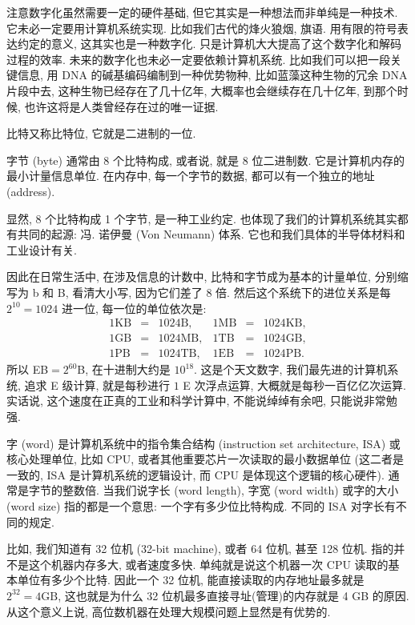 \documentclass[a4paper]{ctexart}
\begin{document}
注意数字化虽然需要一定的硬件基础, 但它其实是一种想法而非单纯是一种技术.
它未必一定要用计算机系统实现. 比如我们古代的烽火狼烟, 旗语. 用有限的符号表达约定的意义,
这其实也是一种数字化. 只是计算机大大提高了这个数字化和解码过程的效率.
未来的数字化也未必一定要依赖计算机系统. 比如我们可以把一段关键信息,
用 DNA 的碱基编码编制到一种优势物种, 比如蓝藻这种生物的冗余 DNA 片段中去,
这种生物已经存在了几十亿年, 大概率也会继续存在几十亿年, 到那个时候,
也许这将是人类曾经存在过的唯一证据.

比特又称比特位, 它就是二进制的一位.

 字节 (byte) 通常由 8 个比特构成, 或者说,
就是 8 位二进制数. 它是计算机内存的最小计量信息单位. 在内存中, 每一个字节的数据,
都可以有一个独立的地址 (address).

显然, 8 个比特构成 1 个字节, 是一种工业约定.
也体现了我们的计算机系统其实都有共同的起源: 冯. 诺伊曼 (Von Neumann)
体系. 它也和我们具体的半导体材料和工业设计有关.

因此在日常生活中, 在涉及信息的计数中, 比特和字节成为基本的计量单位,
分别缩写为 b 和 B, 看清大小写, 因为它们差了 8 倍.
然后这个系统下的进位关系是每 $2^{10} = 1024$ 进一位, 每一位的单位依次是:
$$
\begin{array}{rcllrcl}
1 \mbox{KB} &=& 1024 \mbox{B},& 1 \mbox{MB} &=& 1024 \mbox{KB},\\
1 \mbox{GB} &=& 1024 \mbox{MB},& 1 \mbox{TB} &=& 1024 \mbox{GB},\\
1 \mbox{PB} &=& 1024 \mbox{TB},& 1 \mbox{EB} &=& 1024 \mbox{PB}.
\end{array}
$$
所以 EB$=2^{60}$B, 在十进制大约是 $10^{18}$. 这是个天文数字,
我们最先进的计算机系统, 追求 E 级计算, 就是每秒进行 $1$ E 次浮点运算,
大概就是每秒一百亿亿次运算. 实话说, 这个速度在正真的工业和科学计算中,
不能说绰绰有余吧, 只能说非常勉强.

 字 (word) 是计算机系统中的指令集合结构
(instruction set architecture, ISA) 或核心处理单位, 比如 CPU,
或者其他重要芯片一次读取的最小数据单位 (这二者是一致的, ISA 是计算机系统的逻辑设计,
而 CPU 是体现这个逻辑的核心硬件). 通常是字节的整数倍.
当我们说字长 (word length), 字宽 (word width) 或字的大小 (word size)
指的都是一个意思: 一个字有多少位比特构成. 不同的 ISA 对字长有不同的规定.

 比如, 我们知道有 32 位机 (32-bit machine),
或者 64 位机, 甚至 128 位机. 指的并不是这个机器内存多大, 或者速度多快.
单纯就是说这个机器一次 CPU 读取的基本单位有多少个比特. 因此一个 32 位机,
能直接读取的内存地址最多就是 $2^{32} = 4\mbox{GB}$,
这也就是为什么 32 位机最多直接寻址(管理)的内存就是 4 GB 的原因.
从这个意义上说, 高位数机器在处理大规模问题上显然是有优势的. 
\end{document}
